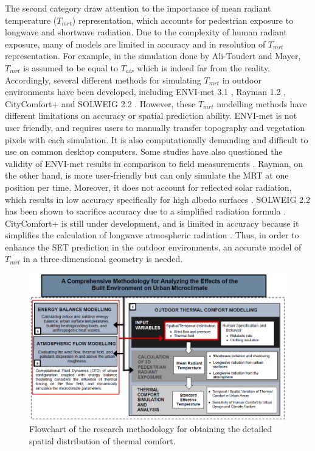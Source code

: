 \documentclass[smallextended]{svjour3}
\begin{document}
The second category draw attention to the importance of mean radiant temperature ($T_{mrt}$) representation, which accounts for pedestrian exposure to longwave and shortwave radiation. Due to the complexity of human radiant exposure, 
many of models are limited in accuracy and in resolution of $T_{mrt}$ representation. For example, in the simulation done by Ali-Toudert and Mayer, $T_{mrt}$ is assumed to be equal to $T_{air}$ which is indeed far from the reality. Accordingly, several different methods for simulating $T_{mrt}$ in outdoor environments have been developed, including ENVI-met 3.1 \citep{bruse2004envi}, Rayman 1.2 \citep{matzarakis2007modelling}, CityComfort+ \citep{huang2014citycomfort+} and SOLWEIG 2.2 \citep{lindberg2008solweig}. However, these $T_{mrt}$ modelling methods have different limitations on accuracy or spatial prediction ability. ENVI-met is not user friendly, and requires users to manually transfer topography and vegetation pixels with each simulation. It is also computationally demanding and difficult to use on common desktop computers. Some studies have also questioned the validity of ENVI-met results in comparison to field measurements \citep{toudertdependence}. Rayman, on the other hand, is more user-friendly but can only simulate the MRT at one position per time. Moreover, it does not account for reflected solar radiation, which results in low accuracy specifically for high albedo surfaces \citep{thorsson2007different}. SOLWEIG 2.2 has been shown to sacrifice accuracy due to a simplified radiation formula \citep{lindberg2008solweig}. CityComfort+ is still under development, and is limited in accuracy because it simplifies the calculation of longwave atmospheric radiation \citep{huang2014citycomfort+}.  Thus, in order to enhance the SET prediction in the outdoor environments, an accurate model of $T_{mrt}$ in a three-dimensional geometry is needed.
\begin{figure}[t]
\graphicspath{ {image/} }
\centerline{\includegraphics[width=\textwidth]{FlowChart_2.png}}
\caption{Flowchart of the research methodology for obtaining the detailed spatial distribution of thermal comfort.}
\label{Fig.FlowChart}
\end{figure}
\end{document}
